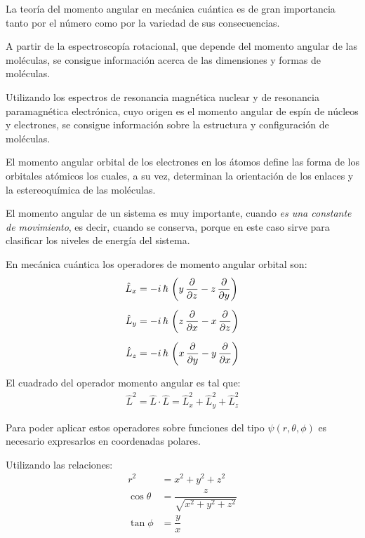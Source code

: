 La teoría del momento angular en mecánica cuántica es de gran importancia tanto por el número como por la variedad de sus consecuencias.
\par
A partir de la espectroscopía rotacional, que depende del momento angular de las moléculas, se consigue información acerca de las dimensiones y formas de moléculas.
\par
Utilizando los espectros de resonancia magnética nuclear y de resonancia paramagnética electrónica, cuyo origen es el momento angular de espín de núcleos y electrones, se consigue información sobre la estructura y configuración de moléculas.
\par
El momento angular orbital de los electrones en los átomos define las forma de los orbitales atómicos los cuales, a su vez, determinan la orientación de los enlaces y la estereoquímica de las moléculas.
\par
El momento angular de un sistema es muy importante, cuando \emph{es una constante de movimiento}, es decir, cuando se conserva, porque en este caso sirve para clasificar los niveles de energía del sistema.
\par
En mecánica cuántica los operadores de momento angular orbital son:
\begin{align}
\begin{aligned}
\hat{L}_{x} &= - i \, \hbar \, \left( y \, \pdv{z} - z \, \pdv{y} \right) \\[0.5em] 
\hat{L}_{y} &= - i \, \hbar \, \left( z \, \pdv{x} - x \, \pdv{z} \right) \\[0.5em] 
\hat{L}_{z} &= - i \, \hbar \, \left( x \, \pdv{y} - y \, \pdv{x} \right)
\end{aligned}
\label{eq:ecuacion_01_03a}
\end{align}

El cuadrado del operador momento angular es tal que:
\begin{align}
\hat{L}^{2} = \hat{L} \cdot \hat{L} = \hat{L}_{x}^{2} + \hat{L}_{y}^{2} + \hat{L}_{z}^{2}
\label{eq:ecuacion_01_03b}
\end{align}

Para poder aplicar estos operadores sobre funciones del tipo $\psi(r, \theta, \phi)$ es necesario expresarlos en coordenadas polares.
\par
Utilizando las relaciones:
\begin{align*}
r^{2} &= x^{2} + y^{2} +z^{2} \\
\cos \theta &= \dfrac{z}{\sqrt{x^{2} + y^{2} +z^{2}}} \\
\tan \phi &= \dfrac{y}{x}
\end{align*}

